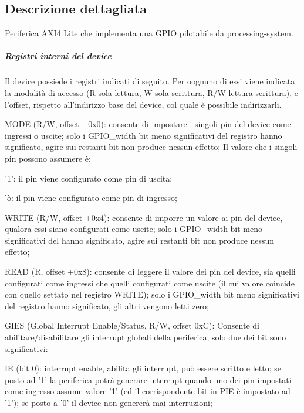 \subsection{Descrizione dettagliata}
Periferica A\+X\+I4 Lite che implementa una G\+P\+I\+O pilotabile da processing-\/system. 

\subparagraph*{Registri interni del device}

Il device possiede i registri indicati di seguito. Per oognuno di essi viene indicata la modalità di accesso (R sola lettura, W sola scrittura, R/\+W lettura scrittura), e l'offset, rispetto all'indirizzo base del device, col quale è possibile indirizzarli.


\begin{DoxyItemize}
\item M\+O\+D\+E (R/\+W, offset +0x0)\+: consente di impostare i singoli pin del device come ingressi o uscite; solo i G\+P\+I\+O\+\_\+width bit meno significativi del registro hanno significato, agire sui restanti bit non produce nessun effetto; Il valore che i singoli pin possono assumere è\+:
\begin{DoxyItemize}
\item '1'\+: il pin viene configurato come pin di uscita;
\item 'ò\+: il pin viene configurato come pin di ingresso;
\end{DoxyItemize}
\item W\+R\+I\+T\+E (R/\+W, offset +0x4)\+: consente di imporre un valore ai pin del device, qualora essi siano configurati come uscite; solo i G\+P\+I\+O\+\_\+width bit meno significativi del hanno significato, agire sui restanti bit non produce nessun effetto;
\item R\+E\+A\+D (R, offset +0x8)\+: consente di leggere il valore dei pin del device, sia quelli configurati come ingressi che quelli configurati come uscite (il cui valore coincide con quello settato nel registro W\+R\+I\+T\+E); solo i G\+P\+I\+O\+\_\+width bit meno significativi del registro hanno significato, gli altri vengono letti zero;
\item G\+I\+E\+S (Global Interrupt Enable/\+Status, R/\+W, offset 0x\+C)\+: Consente di abilitare/disabilitare gli interrupt globali della periferica; solo due dei bit sono significativi\+:
\begin{DoxyItemize}
\item I\+E (bit 0)\+: interrupt enable, abilita gli interrupt, può essere scritto e letto; se posto ad '1' la periferica potrà generare interrupt quando uno dei pin impostati come ingresso assume valore '1' (ed il corrispondente bit in P\+I\+E è impostato ad '1'); se posto a '0' il device non genererà mai interruzioni;

\end{DoxyItemize}
\end{DoxyItemize}
